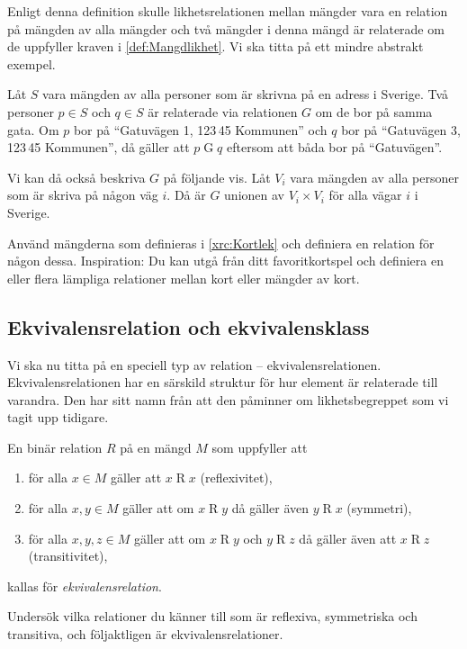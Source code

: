 Enligt denna definition skulle likhetsrelationen mellan mängder vara en
relation på mängden av alla mängder och två mängder i denna mängd är relaterade
om de uppfyller kraven i \cref{def:Mangdlikhet}.
Vi ska titta på ett mindre abstrakt exempel.
\begin{example}
  Låt \(S\) vara mängden av alla personer som är skrivna på en adress i
  Sverige.
  Två personer \(p\in S\) och \(q\in S\) är relaterade via relationen \(G\)
  om de bor på samma gata.
  Om \(p\) bor på \enquote{Gatuvägen 1, 123\,45 Kommunen} och \(q\) bor på
  \enquote{Gatuvägen 3, 123\,45 Kommunen}, då gäller att \(p\mathop G q\) 
  eftersom att båda bor på \enquote{Gatuvägen}.

  Vi kan då också beskriva \(G\) på följande vis.
  Låt \(V_i\) vara mängden av alla personer som är skriva på någon väg \(i\).
  Då är \(G\) unionen av \(V_i\times V_i\) för alla vägar \(i\) i Sverige.
\end{example}

\begin{exercise}
  Använd mängderna som definieras i \cref{xrc:Kortlek} och definiera en
  relation för någon dessa.
  Inspiration: Du kan utgå från ditt favoritkortspel och definiera en eller
  flera lämpliga relationer mellan kort eller mängder av kort.
\end{exercise}


\subsection{Ekvivalensrelation och ekvivalensklass}
Vi ska nu titta på en speciell typ av relation -- ekvivalensrelationen.
Ekvivalensrelationen har en särskild struktur för hur element är relaterade
till varandra.
Den har sitt namn från att den påminner om likhetsbegreppet som vi tagit upp
tidigare.

\begin{definition}\label{def:Ekvivalensrelation}
  En binär relation \(R\) på en mängd \(M\) som uppfyller att
  \begin{enumerate}
    \item för alla \(x\in M\) gäller att \(x\mathop R x\) (reflexivitet),
    \item för alla \(x,y\in M\) gäller att om \(x\mathop R y\) då gäller även
      \(y\mathop R x\) (symmetri),
    \item för alla \(x,y,z\in M\) gäller att om \(x\mathop R y\) och \(y\mathop 
      R z\)
      då gäller även att \(x\mathop R z\) (transitivitet),
  \end{enumerate}
  kallas för \emph{ekvivalensrelation}.
\end{definition}
\begin{exercise}
  Undersök vilka relationer du känner till som är reflexiva, symmetriska och
  transitiva, och följaktligen är ekvivalensrelationer.
\end{exercise}

